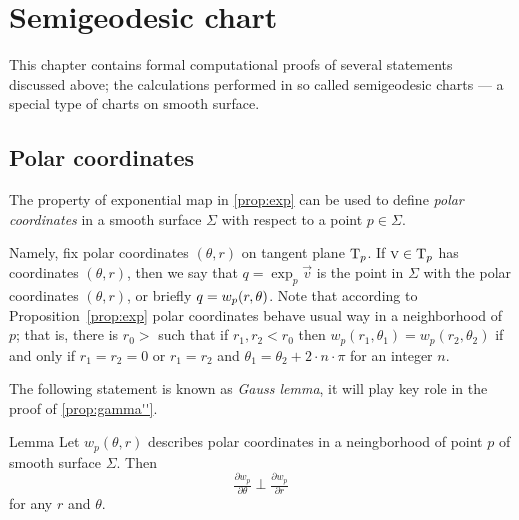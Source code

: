 \chapter{Semigeodesic chart}\label{chap:semigeodesic}

This chapter contains formal computational proofs of several statements discussed above;
the calculations performed in so called semigeodesic charts --- a special type of charts on smooth surface.

\section*{Polar coordinates}

The property of exponential map in \ref{prop:exp} can be used to define \emph{polar coordinates} in a smooth surface $\Sigma$ with respect to a point $p\in \Sigma$.

Namely, fix polar coordinates $(\theta,r)$ on tangent plane $\mathrm{T}_p$.
If $\textsc v\in \mathrm{T}_p$ has coordinates $(\theta,r)$,
then we say that $q=\exp_p\vec v$ is the point in $\Sigma$ with the polar coordinates $(\theta,r)$, or briefly $q\z=w_p(r,\theta)$.
Note that according to Proposition~\ref{prop:exp} polar coordinates behave usual way in a neighborhood of $p$;
that is, there is $r_0>$ such that if $r_1,r_2<r_0$ then $w_p(r_1,\theta_1) = w_p(r_2,\theta_2)$ if and only if
$r_1=r_2=0$ or $r_1=r_2$ and $\theta_1=\theta_2+2\cdot n\cdot\pi$ for an integer $n$.

The following statement is known as \emph{Gauss lemma},
it will play key role in the proof of \ref{prop:gamma''}.

\begin{thm}{Lemma}\label{lem:palar-perp}
Let $w_p(\theta,r)$ describes polar coordinates in a neingborhood of point $p$ of smooth surface $\Sigma$.
Then
\[\tfrac{\partial w_p}{\partial\theta}\perp\tfrac{\partial w_p}{\partial r}\]
for any $r$ and $\theta$.
\end{thm}


